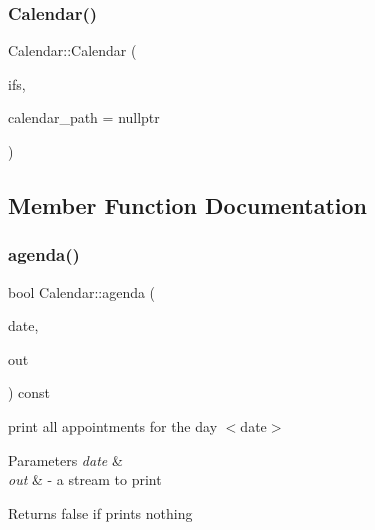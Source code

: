 \mbox{\label{classCalendar_a346673cf7dd15ffa3a2ea292703c5421}} 
\subsubsection{\texorpdfstring{Calendar()}{Calendar()}\hspace{0.1cm}{\footnotesize\ttfamily [3/3]}}
{\footnotesize\ttfamily Calendar\+::\+Calendar (\begin{DoxyParamCaption}\item[{std\+::ifstream \&}]{ifs,  }\item[{\hyperlink{classString}{String} const \&}]{calendar\+\_\+path = {\ttfamily nullptr} }\end{DoxyParamCaption})}



\subsection{Member Function Documentation}
\mbox{\label{classCalendar_ac6112aa4e9b3e6e5b9a478ff66789d77}} 
\subsubsection{\texorpdfstring{agenda()}{agenda()}}
{\footnotesize\ttfamily bool Calendar\+::agenda (\begin{DoxyParamCaption}\item[{\hyperlink{classDate}{Date} const \&}]{date,  }\item[{\hyperlink{doctest_8h_a116af65cb5e924b33ad9d9ecd7a783f3}{std\+::ostream} \&}]{out }\end{DoxyParamCaption}) const}

print all appointments for the day $<$date$>$ 
\begin{DoxyParams}{Parameters}
{\em date} & \\
\hline
{\em out} & -\/ a stream to print \\
\hline
\end{DoxyParams}
\begin{DoxyReturn}{Returns}
false if prints nothing 
\end{DoxyReturn}
\mbox{\label{classCalendar_ac50220dec77b2c19f09516ea88e9398c}} 
